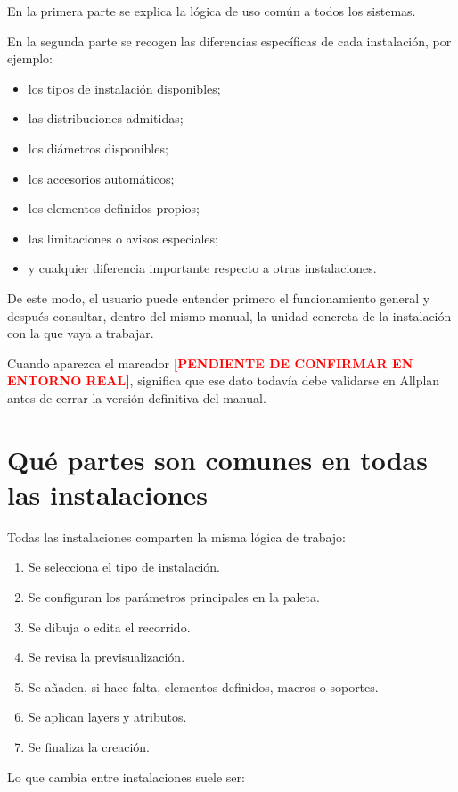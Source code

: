 \documentclass[12pt,a4paper]{article}
\newcommand{\pendingtag}{\textcolor{red}{\textbf{[PENDIENTE DE CONFIRMAR EN ENTORNO REAL]}}}
\begin{document}
En la primera parte se explica la lógica de uso común a todos los sistemas.

En la segunda parte se recogen las diferencias específicas de cada instalación, por ejemplo:

\begin{itemize}
\item los tipos de instalación disponibles;
\item las distribuciones admitidas;
\item los diámetros disponibles;
\item los accesorios automáticos;
\item los elementos definidos propios;
\item las limitaciones o avisos especiales;
\item y cualquier diferencia importante respecto a otras instalaciones.
\end{itemize}

De este modo, el usuario puede entender primero el funcionamiento general y después consultar, dentro del mismo manual, la unidad concreta de la instalación con la que vaya a trabajar.

Cuando aparezca el marcador \pendingtag, significa que ese dato todavía debe validarse en Allplan antes de cerrar la versión definitiva del manual.

\section{Qué partes son comunes en todas las instalaciones}

Todas las instalaciones comparten la misma lógica de trabajo:

\begin{enumerate}
\item Se selecciona el tipo de instalación.
\item Se configuran los parámetros principales en la paleta.
\item Se dibuja o edita el recorrido.
\item Se revisa la previsualización.
\item Se añaden, si hace falta, elementos definidos, macros o soportes.
\item Se aplican layers y atributos.
\item Se finaliza la creación.
\end{enumerate}

Lo que cambia entre instalaciones suele ser:
\end{document}
